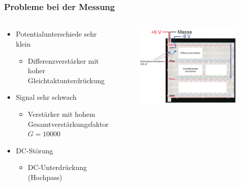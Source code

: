 \begin{frame}
    \frametitle{Probleme bei der Messung}
    \framesubtitle{}
    \begin{columns}[c]
    \begin{block}{}
        \begin{itemize}
            \item Potentialunterschiede sehr klein
            \begin{itemize}
                \item Differenzverstärker mit hoher
                Gleichtaktunterdrückung
            \end{itemize}
            \item Signal sehr schwach
            \begin{itemize}
                \item Verstärker mit hohem Gesamtverstärkungsfaktor $G=10000$
            \end{itemize}
            \item DC-Störung
            \pause
            \begin{itemize}
                \item DC-Unterdrückung (Hochpass)
            \end{itemize}
        \end{itemize}
    \end{block}
    \begin{figure}[H]
    \begin{center}
            \includegraphics[scale=0.22]{./img/schaltung/gesamt_1.png}
    \end{center}
    \end{figure}
    \end{columns}
\end{frame}

